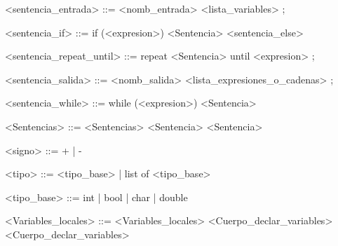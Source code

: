 \begin{grammar}
<sentencia_entrada> ::= <nomb_entrada> <lista_variables> ;

<sentencia_if> ::= if (<expresion>) <Sentencia> <sentencia_else>

<sentencia_repeat_until> ::= repeat <Sentencia> until <expresion> ;

<sentencia_salida> ::= <nomb_salida> <lista_expresiones_o_cadenas> ;

<sentencia_while> ::= while (<expresion>) <Sentencia>

<Sentencias> ::= <Sentencias> <Sentencia>
\alt <Sentencia>

<signo> ::= + | -

<tipo> ::= <tipo_base> | list of <tipo_base>

<tipo_base> ::= int | bool | char | double

<Variables_locales> ::= <Variables_locales> <Cuerpo_declar_variables>
\alt <Cuerpo_declar_variables>

\end{grammar}
